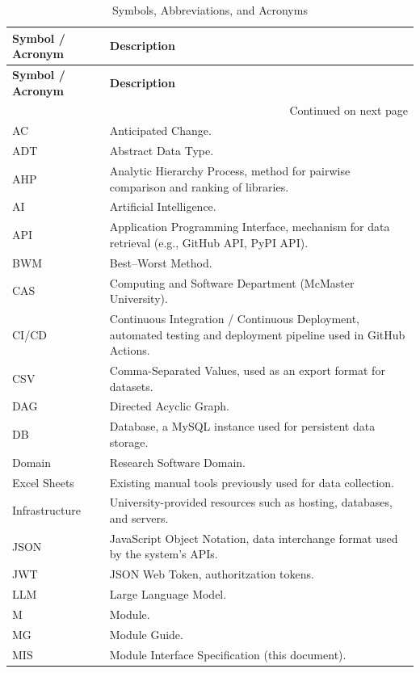 \documentclass[12pt, titlepage]{article}
\begin{document}
\begin{longtable}{@{}l p{}@{}}
\caption{Symbols, Abbreviations, and Acronyms}\\
\toprule
\textbf{Symbol / Acronym} & \textbf{Description}\\
\midrule
\endfirsthead

\toprule
\textbf{Symbol / Acronym} & \textbf{Description}\\
\midrule
\endhead

\midrule
\multicolumn{2}{r}{\small Continued on next page}
\\\bottomrule
\endfoot

\bottomrule
\endlastfoot

AC & Anticipated Change. \\
ADT & Abstract Data Type. \\
AHP & Analytic Hierarchy Process, method for pairwise comparison and ranking of libraries. \\
AI & Artificial Intelligence. \\
API & Application Programming Interface, mechanism for data retrieval (e.g., GitHub API, PyPI API). \\
BWM & Best–Worst Method. \\
CAS & Computing and Software Department (McMaster University). \\
CI/CD & Continuous Integration / Continuous Deployment, automated testing and deployment pipeline used in GitHub Actions. \\
CSV & Comma-Separated Values, used as an export format for datasets. \\
DAG & Directed Acyclic Graph. \\
DB & Database, a MySQL instance used for persistent data storage. \\
Domain & Research Software Domain. \\
Excel Sheets & Existing manual tools previously used for data collection. \\
Infrastructure & University-provided resources such as hosting, databases, and servers. \\
JSON & JavaScript Object Notation, data interchange format used by the system’s APIs. \\
JWT & JSON Web Token, authoritzation tokens. \\
LLM & Large Language Model. \\
M & Module. \\
MG & Module Guide. \\
MIS & Module Interface Specification (this document). \\

\end{longtable}
\end{document}
